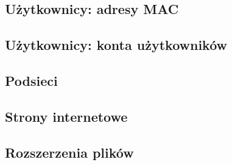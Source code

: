 \documentclass{article}
\begin{document}
\subsection{Użytkownicy: adresy MAC}




\subsection{Użytkownicy: konta użytkowników}



\subsection{Podsieci}



\subsection{Strony internetowe}




\subsection{Rozszerzenia plików}




\end{document}
